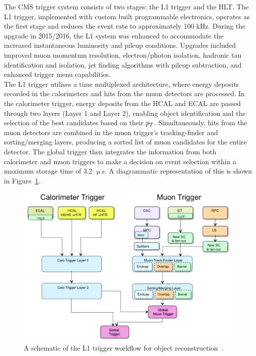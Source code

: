 The \ac{CMS} trigger system consists of two stages: the \ac{L1} trigger and the \ac{HLT}. 
The \ac{L1} trigger, implemented with custom built programmable electronics, operates as the first stage and reduces the event rate to approximately 100 kHz. 
During the upgrade in 2015/2016, the \ac{L1} system was enhanced to accommodate the increased instantaneous luminosity and pileup conditions. 
Upgrades included improved muon momentum resolution, electron/photon isolation, hadronic tau identification and isolation, jet finding algorithms with pileup subtraction, and enhanced trigger menu capabilities. \\

The \ac{L1} trigger utilises a time multiplexed architecture, where energy deposits recorded in the calorimeters and hits from the muon detectors are processed. 
In the calorimeter trigger, energy deposits from the HCAL and ECAL are passed through two layers (Layer 1 and Layer 2), enabling object identification and the selection of the best candidates based on their $p_{T}$. 
Simultaneously, hits from the muon detectors are combined in the muon trigger's tracking-finder and sorting/merging layers, producing a sorted list of muon candidates for the entire detector. 
The global trigger then integrates the information from both calorimeter and muon triggers to make a decision on event selection within a maximum storage time of 3.2 $\upmu$s.
A diagrammatic representation of this is shown in Figure~\ref{fig:trigger}. \\

\begin{figure}[!hbtp]
    \centering
    \includegraphics[width=\textwidth]{Figures/trigger.png}
    \caption{A schematic of the L1 trigger workflow for object reconstruction~\cite{Tapper:2013yva}.}
    \label{fig:trigger}
\end{figure}

